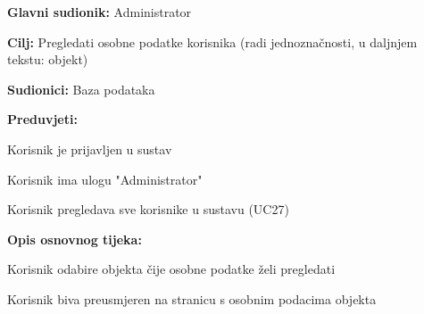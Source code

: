 					\noindent {}
					\begin{packed_item}
	
						\item \textbf{Glavni sudionik: } Administrator
						\item  \textbf{Cilj:} Pregledati osobne podatke korisnika (radi jednoznačnosti, u daljnjem tekstu: objekt)
						\item  \textbf{Sudionici:} Baza podataka
						\item  \textbf{Preduvjeti:}
						\item[] \begin{packed_enum}
							\item Korisnik je prijavljen u sustav
							\item Korisnik ima ulogu "Administrator"
							\item Korisnik pregledava sve korisnike u sustavu (UC27)
						\end{packed_enum}
						\item  \textbf{Opis osnovnog tijeka:}
						
						\item[] \begin{packed_enum}
	
							\item Korisnik odabire objekta čije osobne podatke želi pregledati
							\item Korisnik biva preusmjeren na stranicu s osobnim podacima objekta
						\end{packed_enum}
						
					\end{packed_item}
					
